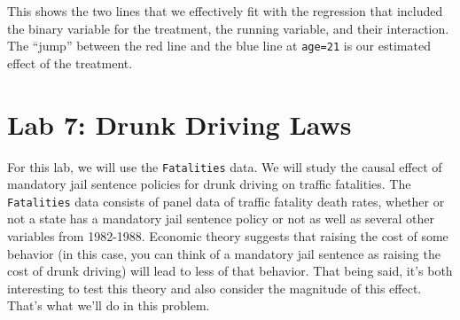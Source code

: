 \documentclass[
  letterpaper,
  DIV=11,
  numbers=noendperiod]{scrreprt}
\begin{document}
This shows the two lines that we effectively fit with the regression
that included the binary variable for the treatment, the running
variable, and their interaction. The ``jump'' between the red line and
the blue line at \texttt{age=21} is our estimated effect of the
treatment.

\section{Lab 7: Drunk Driving Laws}\label{lab-7-drunk-driving-laws}

For this lab, we will use the \texttt{Fatalities} data. We will study
the causal effect of mandatory jail sentence policies for drunk driving
on traffic fatalities. The \texttt{Fatalities} data consists of panel
data of traffic fatality death rates, whether or not a state has a
mandatory jail sentence policy or not as well as several other variables
from 1982-1988. Economic theory suggests that raising the cost of some
behavior (in this case, you can think of a mandatory jail sentence as
raising the cost of drunk driving) will lead to less of that behavior.
That being said, it's both interesting to test this theory and also
consider the magnitude of this effect. That's what we'll do in this
problem.
\end{document}
